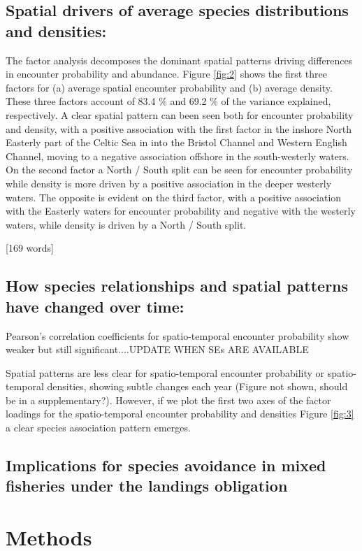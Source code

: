 \documentclass{nature}
\begin{document}
\begin{linenumbers}
[210 words]

\subsection{Spatial drivers of average species distributions and densities:}
The factor analysis decomposes the dominant spatial patterns driving
differences in encounter probability and abundance. Figure \ref{fig:2} shows
the first three factors for (a) average spatial encounter probability and (b)
average density. These three factors account of 83.4 \% and 69.2 \% of the
variance explained, respectively. A clear spatial pattern can been seen both
for encounter probability and density, with a positive association with the
first factor in the inshore North Easterly part of the Celtic Sea in into the
Bristol Channel and Western English Channel, moving to a negative association
offshore in the south-westerly waters. On the second factor a North / South
split can be seen for encounter probability while density is more driven by a
positive association in the deeper westerly waters. The opposite is evident on
the third factor, with a positive association with the Easterly waters for
encounter probability and negative with the westerly waters, while density is
driven by a North / South split.

[169 words]

\subsection{How species relationships and spatial patterns have changed over
	time:}
Pearson's correlation coefficients for spatio-temporal encounter probability
show weaker but still significant....UPDATE WHEN SEs ARE AVAILABLE

Spatial patterns are less clear for spatio-temporal encounter probability or
spatio-temporal densities, showing subtle changes each year (Figure not shown,
should be in a supplementary?). However, if we plot the first two axes of the
factor loadings for the spatio-temporal encounter probability and densities
Figure \ref{fig:3} a clear species association pattern emerges. 

\subsection{Implications for species avoidance in mixed fisheries under the
	landings obligation}



\section*{Methods}


\end{linenumbers}
\end{document}
